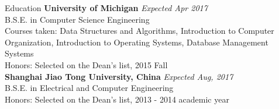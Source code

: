 \documentclass{resume} %
\begin{document}

\begin{rSection}{Education}
{\bf University of Michigan} \hfill {\em Expected Apr 2017} \\ 
B.S.E. in Computer Science Engineering\\
Courses taken: Data Structures and Algorithms, Introduction to Computer Organization, Introduction to Operating Systems, Database Management Systems\\
Honors: Selected on the Dean's list, 2015 Fall\\
{\bf Shanghai Jiao Tong University, China} \hfill {\em Expected Aug, 2017} \\ 
B.S.E. in Electrical and Computer Engineering \\
Honors: Selected on the Dean's list, 2013 - 2014 academic year

\end{rSection}

%			
\end{document}

